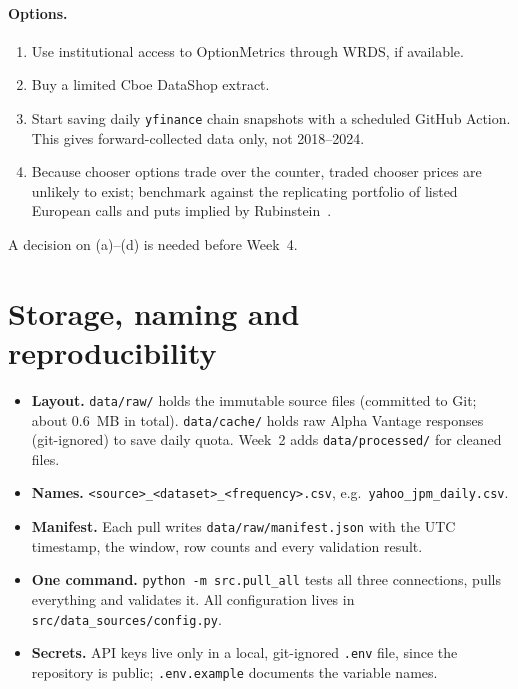 \documentclass[11pt]{article}
\newcommand{\code}[1]{\texttt{#1}}
\begin{document}
\paragraph{Options.}
\begin{enumerate}[label=(\alph*)]
  \item Use institutional access to OptionMetrics through WRDS, if available.
  \item Buy a limited Cboe DataShop extract.
  \item Start saving daily \code{yfinance} chain snapshots with a scheduled GitHub Action. This gives forward-collected
        data only, not 2018--2024.
  \item Because chooser options trade over the counter, traded chooser prices are unlikely to exist; benchmark against
        the replicating portfolio of listed European calls and puts implied by Rubinstein~\cite{rubinstein1991}.
\end{enumerate}
A decision on (a)--(d) is needed before Week~4.

\section{Storage, naming and reproducibility}
\begin{itemize}
  \item \textbf{Layout.} \code{data/raw/} holds the immutable source files (committed to Git; about 0.6~MB in
        total). \code{data/cache/} holds raw Alpha Vantage responses (git-ignored) to save daily quota. Week~2 adds
        \code{data/processed/} for cleaned files.
  \item \textbf{Names.} \code{<source>\_<dataset>\_<frequency>.csv}, e.g.\ \code{yahoo\_jpm\_daily.csv}.
  \item \textbf{Manifest.} Each pull writes \code{data/raw/manifest.json} with the UTC timestamp, the window, row
        counts and every validation result.
  \item \textbf{One command.} \code{python -m src.pull\_all} tests all three connections, pulls everything and
        validates it. All configuration lives in \code{src/data\_sources/config.py}.
  \item \textbf{Secrets.} API keys live only in a local, git-ignored \code{.env} file, since the repository is
        public; \code{.env.example} documents the variable names.
\end{itemize}
\end{document}
